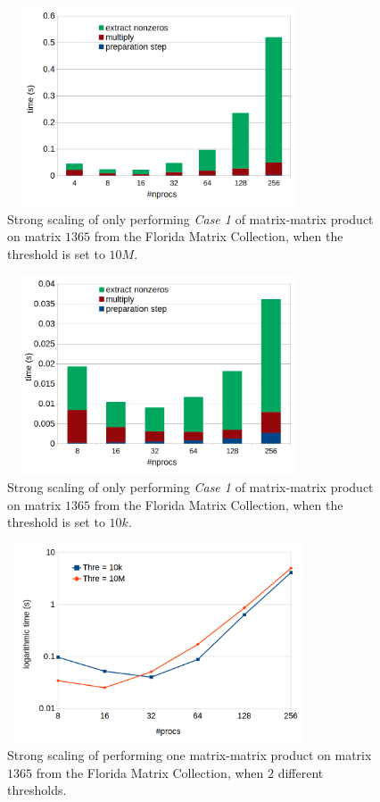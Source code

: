 \documentclass[conference,10pt]{IEEEtran}
\begin{document}
\begin{figure}[htbp]
    \includegraphics[width=9cm,height=5.9cm]{./figures/strong001.png}
    \caption{Strong scaling of only performing \textit{Case 1} of matrix-matrix product on matrix $1365$ from the Florida Matrix Collection, when the threshold is set to $10M$.}
    \label{fig:strong001}
\end{figure}



\begin{figure}[htbp]
    \includegraphics[width=9cm,height=5.9cm]{./figures/strong002.png}
    \caption{Strong scaling of only performing \textit{Case 1} of matrix-matrix product on matrix $1365$ from the Florida Matrix Collection, when the threshold is set to $10k$.}
    \label{fig:strong002}
\end{figure}



\begin{figure}[htbp]
    \includegraphics[width=9cm,height=5.9cm]{./figures/strong003.png}
    \caption{Strong scaling of performing one matrix-matrix product on matrix $1365$ from the Florida Matrix Collection, when $2$ different thresholds.}
    \label{fig:strong003}
\end{figure}

\balance

%
%
%

%
%
\end{document}
